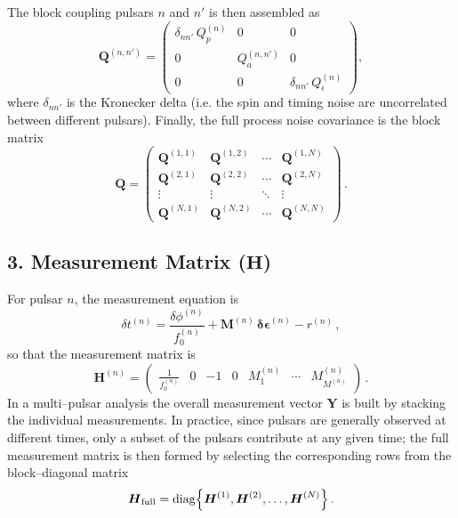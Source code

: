 \documentclass{tufte-handout} %
\begin{document}
	The block coupling pulsars $n$ and $n'$ is then assembled as
	\begin{equation}
		\boldsymbol{Q}^{(n,n')} = \begin{pmatrix}
			\delta_{nn'}\, Q_p^{(n)} & 0 & 0 \\[2mm]
			0 & Q_a^{(n,n')} & 0 \\[2mm]
			0 & 0 & \delta_{nn'}\, Q_\epsilon^{(n)}
		\end{pmatrix},
	\end{equation}
	where $\delta_{nn'}$ is the Kronecker delta (i.e. the spin and timing noise are uncorrelated between different pulsars). Finally, the full process noise covariance is the block matrix
	\begin{equation}
		\boldsymbol{Q} = \begin{pmatrix}
			\boldsymbol{Q}^{(1,1)} & \boldsymbol{Q}^{(1,2)} & \cdots & \boldsymbol{Q}^{(1,N)} \\[1mm]
			\boldsymbol{Q}^{(2,1)} & \boldsymbol{Q}^{(2,2)} & \cdots & \boldsymbol{Q}^{(2,N)} \\[1mm]
			\vdots & \vdots & \ddots & \vdots \\[1mm]
			\boldsymbol{Q}^{(N,1)} & \boldsymbol{Q}^{(N,2)} & \cdots & \boldsymbol{Q}^{(N,N)}
		\end{pmatrix}\,.
	\end{equation}
	
	\subsection*{3. Measurement Matrix (\(\boldsymbol{H}\))}
	
	For pulsar $n$, the measurement equation is
	\begin{equation}
		\delta t^{(n)} = \frac{\delta\phi^{(n)}}{f_0^{(n)}} + \boldsymbol{M}^{(n)}\,\boldsymbol{\delta\epsilon}^{(n)} - r^{(n)}\,,
	\end{equation}
	so that the measurement matrix is
	\begin{equation}
		\boldsymbol{H}^{(n)} = \begin{pmatrix}
			\frac{1}{f_0^{(n)}} & 0 & -1 & 0 & M_1^{(n)} & \cdots & M_{M^{(n)}}^{(n)}
		\end{pmatrix}\,.
	\end{equation}
	In a multi–pulsar analysis the overall measurement vector $\boldsymbol{Y}$ is built by stacking the individual measurements. In practice, since pulsars are generally observed at different times, only a subset of the pulsars contribute at any given time; the full measurement matrix is then formed by selecting the corresponding rows from the block–diagonal matrix
	\begin{equation}
		\boldsymbol{H}_{\mathrm{full}} = \mathrm{diag}\Bigl\{\boldsymbol{H}^{(1)},\boldsymbol{H}^{(2)},\ldots,\boldsymbol{H}^{(N)}\Bigr\}\,.
	\end{equation}
	
\end{document}
